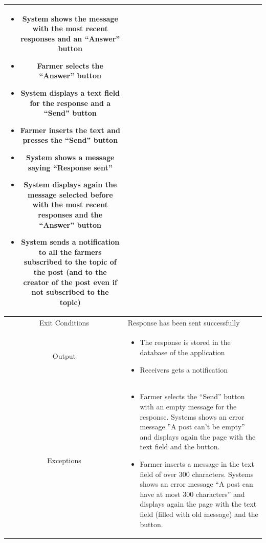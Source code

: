 \documentclass{article}
\begin{document}
\begin{center}
\begin{longtable}{|c| p{10cm}|}
\begin{itemize}
                                \item System shows the message with the most recent responses and an “Answer” button
                                \item Farmer selects the “Answer” button
                                \item System displays a text field for the response and a “Send” button
                                \item Farmer inserts the text and presses the “Send” button
                                \item System shows a message saying “Response sent” 
                                \item System displays again the message selected before with the most recent responses and the “Answer” button
                                \item System sends a notification to all the farmers subscribed to the topic of the post (and to the creator of the post even if not subscribed to the topic)
                            \end{itemize} \\
        \hline
            Exit Conditions & Response has been sent successfully\\
        \hline
            Output &    \begin{itemize}
                            \item The response is stored in the database of the application
                            \item Receivers gets a notification
                        \end{itemize}\\
        \hline
            Exceptions &    \begin{itemize}
                                \item Farmer selects the “Send” button with an empty message for the response. Systems shows an error message ”A post can’t be empty” and displays again the page with the text field and the button.
                                \item Farmer inserts a message in the text field of over 300 characters. Systems shows an error message “A post can have at most 300 characters” and displays again the page with the text field (filled with old message) and the button.
                            \end{itemize} \\
        \hline
    \end{longtable}
    

\end{center}
\end{document}
